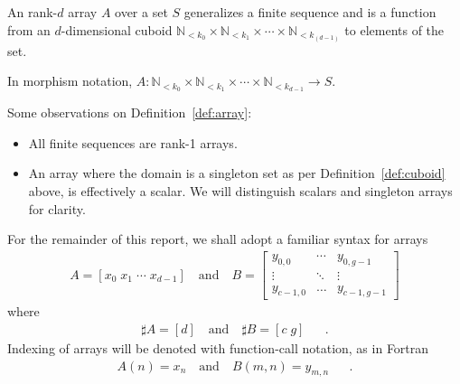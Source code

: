 \documentclass{DIKU-report-variant}
\newcommand\Nat{\mathbb{N}}
\begin{document}
\begin{definition}
  \label{def:array}
  An rank-\(d\) array \(A\) over a set \(S\) generalizes a finite sequence and
  is a function from an \(d\)-dimensional cuboid
  \(\Nat_{<k_0} \times \Nat_{<k_1} \times \cdots \times \Nat_{<k_(d-1)}\) to elements of the set.

  In morphism notation, \(A : \Nat_{<k_0} \times \Nat_{<k_1} \times \cdots \times \Nat_{<k_{d-1}} \to S\).
\end{definition}
\begin{observation}
  \label{ob:array}
  Some observations on Definition~\ref{def:array}:
  \begin{itemize}
    \item All finite sequences are rank-1 arrays.
    \item An array where the domain is a singleton set as per Definition~\ref{def:cuboid} above,
      is effectively a scalar. We will distinguish scalars and singleton arrays for clarity.
  \end{itemize}
\end{observation}

\begin{remark}
  \label{rem:syntax}
  For the remainder of this report, we shall adopt a familiar syntax for arrays
  \begin{align*}
    A = [ x_0\; x_1\; \cdots \; x_{d-1} ] \quad \text{and} \quad
    B = \begin{bmatrix}
      y_{0,0} & \cdots & y_{0,g-1} \\
      \vdots & \ddots & \vdots \\
      y_{c-1,0} & \dots  & y_{c-1,g-1} 
    \end{bmatrix}
  \end{align*}
  where
  \begin{align*}
    \sharp A = [d] \quad \text{and} \quad \sharp B = [ c\; g ] && .
  \end{align*}
  Indexing of arrays will be denoted with function-call notation, as in Fortran
  \begin{align*}
    A(n) = x_n \quad \text{and} \quad B(m,n) = y_{m,n} && .
  \end{align*}
\end{remark}
\end{document}
